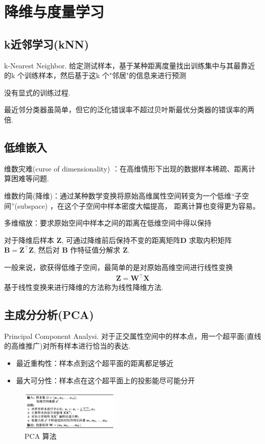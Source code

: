 \newpage
\section{降维与度量学习}
\subsection{k近邻学习(kNN)}
k-Nearest Neighbor. 给定测试样本，基于某种距离度量找出训练集中与其最靠近的k
个训练样本，然后基于这k 个"邻居"的信息来进行预测

没有显式的训练过程. 

最近邻分类器虽简单，但它的泛化错误率不超过贝叶斯最优分类器的错误率的两倍.  

\subsection{低维嵌入}
维数灾难(curse of dimensionality) ：在高维情形下出现的数据样本稀疏、距离计算困难等问题. 

维数约简(降维)：通过某种数学变换将原始高维属性空间转变为一个低维“子空间”(subspace) ，在这个子空间中样本密度大幅提高， 距离计算也变得更为容易。

多维缩放：要求原始空间中样本之间的距离在低维空间中得以保持


对于降维后样本 $\bm Z$, 可通过降维前后保持不变的距离矩阵$\bm D$ 求取内积矩阵$\bm B=\bm {Z}^\top\bm {Z}$, 然后对 $\bm B$ 作特征值分解求 $\bm Z$. 

一般来说，欲获得低维子空间，最简单的是对原始高维空间进行线性变换
\begin{align*}
    \bm Z=\bm{W}^\top \bm X
\end{align*}
基于线性变换来进行降维的方法称为线性降维方法. 

\subsection{主成分分析(PCA)}
Principal Component Analysi. 对于正交属性空间中的样本点，用一个超平面(直线的高维推广)对所有样本进行恰当的表达. 
\begin{itemize}
    \item 最近重构性：样本点到这个超平面的距离都足够近
    \item 最大可分性：样本点在这个超平面上的投影能尽可能分开
\end{itemize}


\begin{figure}[!htb]
    \centering
    \includegraphics[width=0.42\textwidth]{pic/ML10/PCA 算法}
    \caption{PCA 算法}
\end{figure}


